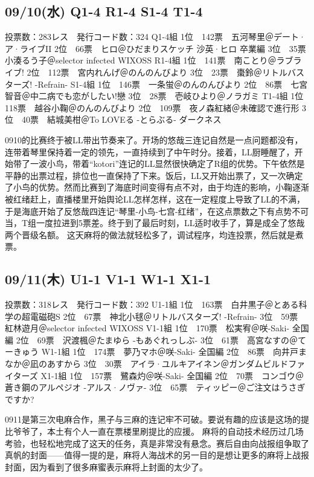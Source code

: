 \subsection{09/10(水) Q1-4 R1-4 S1-4 T1-4}

    投票数：283レス　発行コード数：324
    Q1-4組
    1位　142票　五河琴里＠デート·ア·ライブII
    2位　66票　ヒロ＠ひだまりスケッチ 沙英·ヒロ 卒業編
    3位　35票　小湊るう子＠selector infected WIXOSS
    R1-4組
    1位　141票　南ことり＠ラブライブ!
    2位　112票　宮内れんげ＠のんのんびより
    3位　23票　棗鈴＠リトルバスターズ! -Refrain-
    S1-4組
    1位　146票　一条蛍＠のんのんびより
    2位　86票　七宮智音＠中二病でも恋がしたい!戀
    3位　28票　壱岐ひより＠ノラガミ
    T1-4組
    1位　118票　越谷小鞠＠のんのんびより
    2位　109票　夜ノ森紅緒＠未確認で進行形
    3位　40票　結城美柑＠To LOVEる -とらぶる- ダークネス

0910的比赛终于被LL带出节奏来了。开场的悠哉三连记自然是一点问题都没有，连带着琴里保持着一定的领先，一直持续到了中午时分。接着，LL厨睡醒了，开始带了一波小鸟，带着“kotori”连记的LL显然很快确定了R组的优势。下午依然是平静的出票过程，排位也一直保持了下来。饭后，LL又开始出票了，又一次确定了小鸟的优势。然而比赛到了海底时间变得有点不对，由于均连的影响，小鞠逐渐被红绪赶上，直播楼里开始舆论LL怎样怎样，这在一定程度上导致了LL的不满，于是海底开始了反悠哉四连记“琴里-小鸟-七宫-红绪”，在这点票数之下有点势不可当，T组一度拉进到5票差。终于到了最后时刻，LL适时收手了，算是成全了悠哉两个晋级名额。
这天麻将的做法就轻松多了，调试程序，均连投票，然后就是煮票。

\subsection{09/11(木) U1-1 V1-1 W1-1 X1-1}

    投票数：318レス　発行コード数：392
    U1-1組
    1位　163票　白井黒子＠とある科学の超電磁砲S
    2位　67票　神北小毬＠リトルバスターズ! -Refrain-
    3位　59票　紅林遊月＠selector infected WIXOSS
    V1-1組
    1位　170票　松実宥＠咲-Saki- 全国編
    2位　69票　沢渡楓＠たまゆら -もあぐれっしぶ-
    3位　61票　高宮なすの＠てーきゅう
    W1-1組
    1位　174票　夢乃マホ＠咲-Saki- 全国編
    2位　86票　向井戸まなか＠凪のあすから
    3位　30票　アイラ·ユルキアイネン＠ガンダムビルドファイターズ
    X1-1組
    1位　157票　鷺森灼＠咲-Saki- 全国編
    2位　70票　コンゴウ＠蒼き鋼のアルペジオ -アルス·ノヴァ-
    3位　65票　ティッピー＠ご注文はうさぎですか?

0911是第三次电麻合作，黑子与三麻的连记牢不可破。要说有趣的应该是这场的提比爷爷了，本土有个人一直在票楼里刷提比的应援。
麻将的自动技术经历过几场考验，也轻松地完成了这天的任务，真是非常没有悬念。赛后自由向战报组争取了真帆的封面——值得一提的是，麻将人海战术的另一目的是想让更多的麻将上战报封面，因为看到了很多麻蜜表示麻将上封面的太少了。

